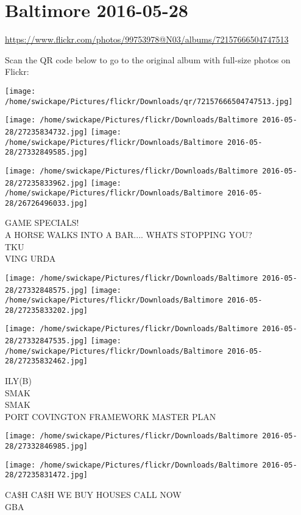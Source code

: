 \documentclass[10pt,letterpaper]{article}
\title{}
\author{}
\date{}
\begin{document}
\section*{Baltimore 2016-05-28}

\url{https://www.flickr.com/photos/99753978@N03/albums/72157666504747513}

Scan the QR code below to go to the original album with full-size photos on Flickr:

\texttt{[image: /home/swickape/Pictures/flickr/Downloads/qr/72157666504747513.jpg]}
\pagebreak

\texttt{[image: /home/swickape/Pictures/flickr/Downloads/Baltimore 2016-05-28/27235834732.jpg]}
\texttt{[image: /home/swickape/Pictures/flickr/Downloads/Baltimore 2016-05-28/27332849585.jpg]}

\texttt{[image: /home/swickape/Pictures/flickr/Downloads/Baltimore 2016-05-28/27235833962.jpg]}
\texttt{[image: /home/swickape/Pictures/flickr/Downloads/Baltimore 2016-05-28/26726496033.jpg]}

GAME SPECIALS!\\
A HORSE WALKS INTO A BAR.... WHATS STOPPING YOU?\\
TKU\\
VING URDA
\pagebreak

\texttt{[image: /home/swickape/Pictures/flickr/Downloads/Baltimore 2016-05-28/27332848575.jpg]}
\texttt{[image: /home/swickape/Pictures/flickr/Downloads/Baltimore 2016-05-28/27235833202.jpg]}

\texttt{[image: /home/swickape/Pictures/flickr/Downloads/Baltimore 2016-05-28/27332847535.jpg]}
\texttt{[image: /home/swickape/Pictures/flickr/Downloads/Baltimore 2016-05-28/27235832462.jpg]}

ILY(B)\\
SMAK\\
SMAK\\
PORT COVINGTON FRAMEWORK MASTER PLAN
\pagebreak

\texttt{[image: /home/swickape/Pictures/flickr/Downloads/Baltimore 2016-05-28/27332846985.jpg]}

\vspace{0.25in}
\texttt{[image: /home/swickape/Pictures/flickr/Downloads/Baltimore 2016-05-28/27235831472.jpg]}

CA\$H CA\$H WE BUY HOUSES CALL NOW\\
GBA
\pagebreak
\end{document}
